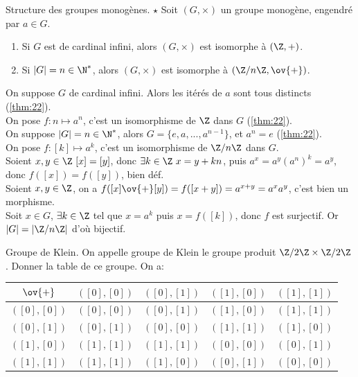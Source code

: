 \documentclass[11pt]{article}
\begin{document}
\vspace*{-0.8cm}

\begin{thm}{Structure des groupes monogènes. $\star$}{}
    Soit $(G,\times)$ un groupe monogène, engendré par $a\in G$.
    \begin{enumerate}
        \item Si $G$ est de cardinal infini, alors $(G,\times)$ est isomorphe à $(\Z,+)$.
        \item Si $|G|=n\in\N^*$, alors $(G,\times)$ est isomorphe à $(\Z/n\Z,\ov{+})$.
    \end{enumerate}
    \tcblower
     On suppose $G$ de cardinal infini. Alors les itérés de $a$ sont tous distincts (\ref{thm:22}).\\
    On pose $f:n\mapsto a^n$, c'est un isomorphisme de $\Z$ dans $G$ (\ref{thm:22}).\\
     On suppose $|G|=n\in\N^*$, alors $G=\{e,a,...,a^{n-1}\}$, et $a^n=e$ (\ref{thm:22}).\\
    On pose $f:[k]\mapsto a^k$, c'est un isomorphisme de $\Z/n\Z$ dans $G$.\\
    Soient $x,y\in\Z ~ [x]=[y]$, donc $\exists k\in\Z ~ x=y+kn$, puis $a^x=a^y(a^n)^k=a^y$, donc $f([x])=f([y])$, bien déf.\\
    Soient $x,y\in\Z$, on a $f([x]\ov{+}[y])=f([x+y])=a^{x+y}=a^xa^y$, c'est bien un morphisme.\\
    Soit $x\in G$, $\exists k\in\Z$ tel que $x=a^k$ puis $x=f([k])$, donc $f$ est surjectif. Or $|G|=|\Z/n\Z|$ d'où bijectif.
\end{thm}

\vspace*{-0.8cm}

\begin{ex}{Groupe de Klein.}{}
    On appelle groupe de Klein le groupe produit $\Z/2\Z\times\Z/2\Z$. Donner la table de ce groupe.
    \tcblower
    On a:
    \begin{center}
        \begin{tabular}{c|cccc}
            $\ov{+}$ & $([0],[0])$ & $([0],[1])$ & $([1],[0])$ & $([1],[1])$\\
            \hline
            $([0],[0])$ & $([0],[0])$ & $([0],[1])$ & $([1],[0])$ & $([1],[1])$\\
            $([0],[1])$ & $([0],[1])$ & $([0],[0])$ & $([1],[1])$ & $([1],[0])$\\
            $([1],[0])$ & $([1],[1])$ & $([1],[1])$ & $([0],[0])$ & $([0],[1])$\\
            $([1],[1])$ & $([1],[1])$ & $([1],[0])$ & $([0],[1])$ & $([0],[0])$
        \end{tabular}
    \end{center}
\end{ex}
\end{document}
